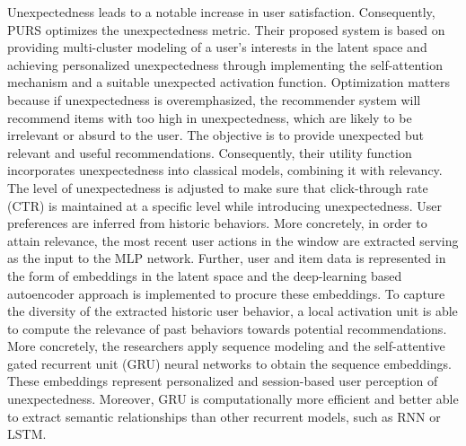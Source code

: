Unexpectedness leads to a notable increase in user satisfaction. Consequently, PURS optimizes the unexpectedness metric. Their proposed system is based on providing multi-cluster modeling of a user’s interests in the latent space and achieving personalized unexpectedness through implementing the self-attention mechanism and a suitable unexpected activation function. Optimization matters because if unexpectedness is overemphasized, the recommender system will recommend items with too high in unexpectedness, which are likely to be irrelevant or absurd to the user. The objective is to provide unexpected but relevant and useful recommendations. Consequently, their utility function incorporates unexpectedness into classical models, combining it with relevancy. The level of unexpectedness is adjusted to make sure that click-through rate (CTR) is maintained at a specific level while introducing unexpectedness. 
User preferences are inferred from historic behaviors. More concretely, in order to attain relevance, the most recent user actions in the window are extracted serving as the input to the MLP network. Further, user and item data is represented in the form of embeddings in the latent space and the deep-learning based autoencoder approach is implemented to procure these embeddings. 
To capture the diversity of the extracted historic user behavior,  a local activation unit is able to compute the relevance of past behaviors towards potential recommendations. More concretely, the researchers apply sequence modeling and the self-attentive gated recurrent unit (GRU) neural networks to obtain the sequence embeddings. These embeddings represent personalized and session-based user perception of unexpectedness. Moreover, GRU is computationally more efficient and better able to extract semantic relationships than other recurrent models, such as RNN or LSTM.
